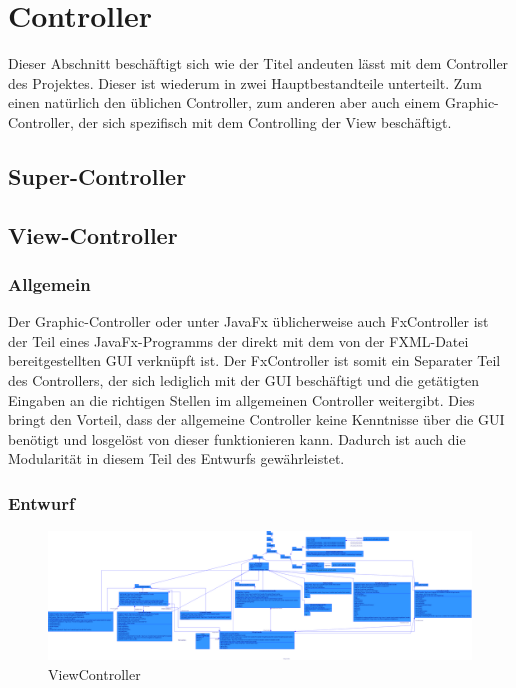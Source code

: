 	\section{Controller}
	Dieser Abschnitt beschäftigt sich wie der Titel andeuten lässt mit dem Controller des Projektes.
	Dieser ist wiederum in zwei Hauptbestandteile unterteilt.
		Zum einen natürlich den üblichen Controller, zum anderen aber auch einem Graphic-Controller, der sich spezifisch mit dem Controlling der View beschäftigt.
	
	\subsection{Super-Controller}
	
	
	\subsection{View-Controller}
	\subsubsection{Allgemein}
		Der Graphic-Controller oder unter JavaFx üblicherweise auch FxController ist der Teil eines JavaFx-Programms der direkt mit dem von der FXML-Datei bereitgestellten GUI verknüpft ist.
		Der FxController ist somit ein Separater Teil des Controllers, der sich lediglich mit der GUI beschäftigt und die getätigten Eingaben an die richtigen Stellen im allgemeinen Controller weitergibt.
			Dies bringt den Vorteil, dass der allgemeine Controller keine Kenntnisse über die GUI benötigt und losgelöst von dieser funktionieren kann.
			Dadurch ist auch die Modularität in diesem Teil des Entwurfs gewährleistet.
	
	\subsubsection{Entwurf}
		\begin{figure}
	\centering	
\includegraphics[width=\textwidth]{abbildungen/ClassDiagram_ViewController.png}
\caption{ViewController}
\label{img:viewcontroller}
	\end{figure}
		
	
	

